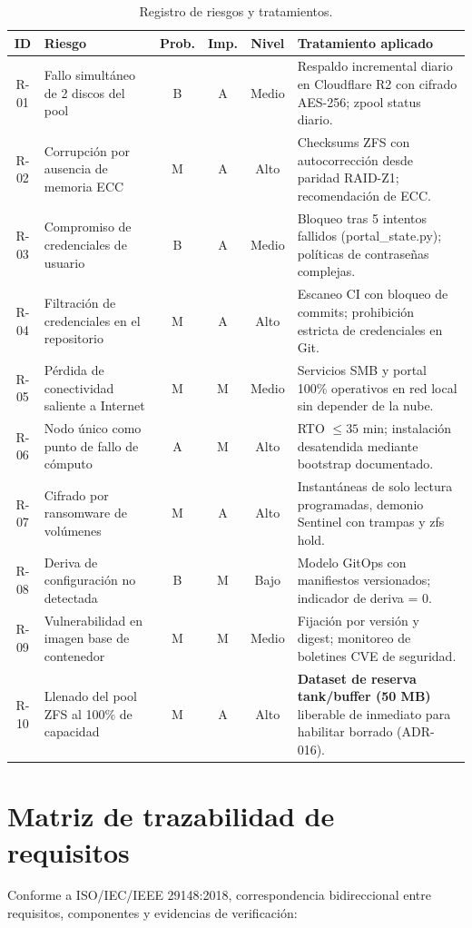 \documentclass[10pt,a4paper]{article}
\begin{document}
\begin{table}[htbp]
\centering
\small
\caption{Registro de riesgos y tratamientos.}
\label{tab:riesgos}
\begin{tabular}{|c|p{4.2cm}|c|c|c|p{5.8cm}|}
\hline
\textbf{\textsf{ID}} & \textbf{\textsf{Riesgo}} & \textbf{\textsf{Prob.}} & \textbf{\textsf{Imp.}} & \textbf{\textsf{Nivel}} & \textbf{\textsf{Tratamiento aplicado}} \\
\hline
R-01 & Fallo simultáneo de 2 discos del pool & B & A & Medio & Respaldo incremental diario en Cloudflare R2 con cifrado AES-256; zpool status diario. \\
\hline
R-02 & Corrupción por ausencia de memoria ECC & M & A & Alto & Checksums ZFS con autocorrección desde paridad RAID-Z1; recomendación de ECC. \\
\hline
R-03 & Compromiso de credenciales de usuario & B & A & Medio & Bloqueo tras 5 intentos fallidos (portal\_state.py); políticas de contraseñas complejas. \\
\hline
R-04 & Filtración de credenciales en el repositorio & M & A & Alto & Escaneo CI con bloqueo de commits; prohibición estricta de credenciales en Git. \\
\hline
R-05 & Pérdida de conectividad saliente a Internet & M & M & Medio & Servicios SMB y portal 100\% operativos en red local sin depender de la nube. \\
\hline
R-06 & Nodo único como punto de fallo de cómputo & A & M & Alto & RTO $\le 35$ min; instalación desatendida mediante bootstrap documentado. \\
\hline
R-07 & Cifrado por ransomware de volúmenes & M & A & Alto & Instantáneas de solo lectura programadas, demonio Sentinel con trampas y zfs hold. \\
\hline
R-08 & Deriva de configuración no detectada & B & M & Bajo & Modelo GitOps con manifiestos versionados; indicador de deriva = 0. \\
\hline
R-09 & Vulnerabilidad en imagen base de contenedor & M & M & Medio & Fijación por versión y digest; monitoreo de boletines CVE de seguridad. \\
\hline
R-10 & Llenado del pool ZFS al 100\% de capacidad & M & A & Alto & \textbf{Dataset de reserva tank/buffer (50 MB)} liberable de inmediato para habilitar borrado (ADR-016). \\
\hline
\end{tabular}
\end{table}

\section{Matriz de trazabilidad de requisitos}
Conforme a ISO/IEC/IEEE 29148:2018, correspondencia bidireccional entre requisitos, componentes y evidencias de verificación:
\end{document}

